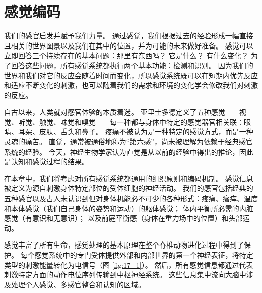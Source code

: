 \chapter{感觉编码} \label{chap:chap17}


我们的感官启发并赋予我们力量。 
通过感觉，我们根据过去的经验形成一幅直接且相关的世界图景以及我们在其中的位置，并为可能的未来做好准备。 
感觉可以立即回答三个持续存在的基本问题：那里有东西吗？ 它是什么？ 有什么变化？ 
为了回答这些问题，所有感觉系统都执行两个基本功能：检测和识别。 
因为我们的世界和我们对它的反应会随着时间而变化，所以感觉系统既可以在短期内优先反应和适应不断变化的刺激，也可以随着我们的需求和环境的变化学会修改我们对刺激的反应。


自古以来，人类就对感官体验的本质着迷。 
亚里士多德定义了五种感觉——视觉、听觉、触觉、味觉和嗅觉——每一种都与身体中特定的感觉器官相关联：眼睛、耳朵、皮肤、舌头和鼻子。 
疼痛不被认为是一种特定的感觉方式，而是一种灵魂的痛苦。 
直觉，通常被通俗地称为“第六感”，尚未被理解为依赖于经典感官系统的经验。 
今天，神经生物学家认为直觉是从以前的经验中得出的推论，因此是认知和感觉过程的结果。


在本章中，我们将考虑对所有感觉系统都通用的组织原则和编码机制。 
感觉信息被定义为源自刺激身体特定部位的受体细胞的神经活动。 
我们的感官包括经典的五种感官以及古人未认识到但对身体机能必不可少的各种形式：疼痛、瘙痒、温度和本体感觉（我们自己身体的姿势和运动）的躯体感觉； 
体内平衡所必需的内脏感觉（有意识和无意识）； 
以及前庭平衡感（身体在重力场中的位置）和头部运动。


感觉丰富了所有生命，感觉处理的基本原理在整个脊椎动物进化过程中得到了保护。
每个感觉系统中的专门受体提供外部和内部世界的第一个神经表征，将特定类型的刺激能量转化为电信号（图 \ref{fig:17_1}）。 
然后，所有感觉信息都通过代表刺激特定方面的动作电位序列传输到中枢神经系统。
这些信息集中流向大脑中涉及处理个人感觉、多感官整合和认知的区域。


